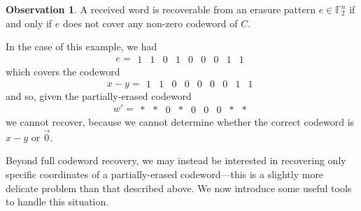 \documentclass[12pt]{article}
\newcommand{\F}{\mathbb{F}}
\def\F{\mathbb F}
\theoremstyle{definition}
\newtheorem{obs}[theorem]{Observation}
\begin{document}
\begin{obs}
A received word is recoverable from an erasure pattern \(e \in \F_2^n\)  if and only if \(e\) does not cover any non-zero codeword of \(C\).
\end{obs}

In the case of this example, we had
\[
e = \begin{array}{ccccccccc} 1& 1& 0& 1& 0& 0& 0& 1& 1 \end{array}
\]
which covers the codeword
\[
x-y =  \begin{array}{ccccccccc} 1& 1& 0& 0& 0& 0& 0& 1& 1 \end{array}
\]
and so, given the partially-erased codeword
\[
w' = \begin{array}{ccccccccc} *& *& 0& *& 0& 0& 0& *& * \end{array}
\]
we cannot recover, because we cannot determine whether the correct codeword is \(x-y\) or \(\vec{0}\).

\iffalse
To consider the impact of erasures on recovery using a such a code $C$, we can focus on the all-zero codeword. Observe that it can be recovered from a received word if and only if the erasure pattern does not cover the nonzero coordinates of a codeword. For instance, an erasure pattern of 
\begin{align*}
\begin{array}{ccccccccccc}
e&=&*&*&0&*&*&0&0&*&*
\end{array}
\end{align*}
makes it impossible to ascertain if 
\begin{align*}
\begin{array}{ccccccccccc}
c&=&1&1&0&1&1&0&0&0&1  
\end{array}
\end{align*}
or 
\begin{align*}
\begin{array}{ccccccccccc}
c'&=&0&0&0&0&0&0&0&0&0  
\end{array}
\end{align*}
was sent. Here, the impact of $e$ is that symbols in all but the third, sixth, and seventh coordinates are erased. To describe the interplay between erasure patterns and recovery of particular coordinates, we introduce some useful tools in the next subsection. 
\fi


Beyond full codeword recovery, we may instead be interested in recovering only specific coordinates of a partially-erased codeword---this is a slightly more delicate problem than that described above. We now introduce some useful tools to handle this situation.
\end{document}
